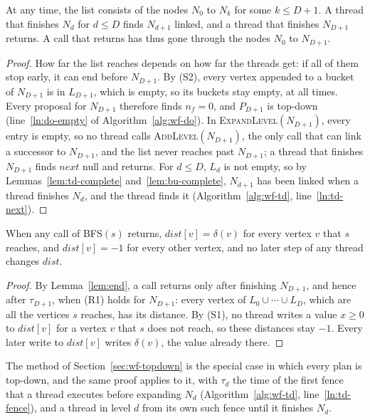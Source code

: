 \begin{lemma}
\label{lem:end}
At any time, the list consists of the nodes $N_0$ to $N_k$ for some $k \leq D+1$. A thread that finishes $N_d$ for $d \leq D$ finds $N_{d+1}$ linked, and a thread that finishes $N_{D+1}$ returns. A call that returns has thus gone through the nodes $N_0$ to $N_{D+1}$.
\end{lemma}
\begin{proof}
How far the list reaches depends on how far the threads get: if all of them stop early, it can end before $N_{D+1}$. By (S2), every vertex appended to a bucket of $N_{D+1}$ is in $L_{D+1}$, which is empty, so its buckets stay empty, at all times. Every proposal for $N_{D+1}$ therefore finds $n_f = 0$, and $P_{D+1}$ is top-down (line~\ref{ln:do-empty} of Algorithm~\ref{alg:wf-do}). In \textsc{ExpandLevel}$(N_{D+1})$, every entry is empty, so no thread calls \textsc{AddLevel}$(N_{D+1})$, the only call that can link a successor to $N_{D+1}$, and the list never reaches past $N_{D+1}$; a thread that finishes $N_{D+1}$ finds $\mathit{next}$ null and returns. For $d \leq D$, $L_d$ is not empty, so by Lemmas~\ref{lem:td-complete} and~\ref{lem:bu-complete}, $N_{d+1}$ has been linked when a thread finishes $N_d$, and the thread finds it (Algorithm~\ref{alg:wf-td}, line~\ref{ln:td-next}).
\end{proof}

\begin{theorem}[Correctness]
\label{thm:correct}
When any call of \textsc{BFS}$(s)$ returns, $\mathit{dist}[v] = \delta(v)$ for every vertex $v$ that $s$ reaches, and $\mathit{dist}[v] = -1$ for every other vertex, and no later step of any thread changes $\mathit{dist}$.
\end{theorem}
\begin{proof}
By Lemma~\ref{lem:end}, a call returns only after finishing $N_{D+1}$, and hence after $\tau_{D+1}$, when (R1) holds for $N_{D+1}$: every vertex of $L_0 \cup \cdots \cup L_D$, which are all the vertices $s$ reaches, has its distance. By (S1), no thread writes a value $x \geq 0$ to $\mathit{dist}[v]$ for a vertex $v$ that $s$ does not reach, so these distances stay $-1$. Every later write to $\mathit{dist}[v]$ writes $\delta(v)$, the value already there.
\end{proof}

The method of Section~\ref{sec:wf-topdown} is the special case in which every plan is top-down, and the same proof applies to it, with $\tau_d$ the time of the first fence that a thread executes before expanding $N_d$ (Algorithm~\ref{alg:wf-td}, line~\ref{ln:td-fence}), and a thread in level $d$ from its own such fence until it finishes $N_d$.

